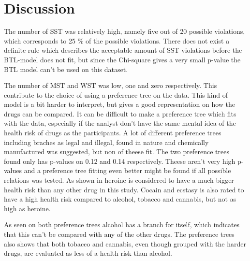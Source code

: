 \section*{Discussion}
\label{Discussion}
%
The number of SST was relatively high, namely five out of 20 possible violations, which corresponds to 25 \% of the possible violations. There does not exist a definite rule which describes the acceptable amount of SST violations before the BTL-model does not fit, but since the Chi-square gives a very small p-value the BTL model can't be used on this dataset.  

The number of MST and WST was low, one and zero respectively. This contribute to the choice of using a preference tree on the data. This kind of model is a bit harder to interpret, but gives a good representation on how the drugs can be compared. It can be difficult to make a preference tree which fits with the data, especially if the analyst don't have the same mental idea of the health risk of drugs as the participants. A lot of different preference trees including braches as legal and illegal, found in nature and chemically manufactured was suggested, but non of theese fit. \blankline 
%
The two preference trees found only has p-values on 0.12 and 0.14 respectively. Theese aren't very high p-values and a preference tree fitting even better might be found if all possible relations was tested. \blankline 
%
As shown in  heroine is considered to have a much bigger health risk than any other drug in this study. Cocain and ecstasy is also rated to have a high health risk compared to alcohol, tobacco and cannabis, but not as high as heroine.

As seen on both preference trees alcohol has a branch for itself, which indicates that this can't be compared with any of the other drugs. The preference trees also shows that both tobacco and cannabis, even though grouped with the harder drugs, are evaluated as less of a health risk than alcohol.